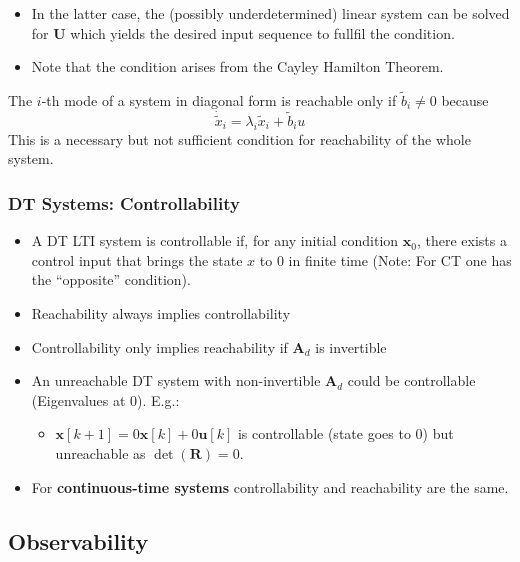 \newpar{}
\begin{itemize}
    \item In the latter case, the (possibly underdetermined) linear system can be solved for $\mathbf{U}$ which yields the desired input sequence to fullfil the condition.
    \item Note that the condition arises from the Cayley Hamilton Theorem.
\end{itemize}


The $i$-th mode of a system in diagonal form is reachable only if $\tilde{b}_i \neq 0$ because
\begin{equation*}
    \dot{\tilde{x}}_i =\lambda_i\tilde{x}_i+\tilde{b}_i u
\end{equation*}
This is a necessary but not sufficient condition for reachability of the whole system.

\subsubsection{DT Systems: Controllability}

\begin{itemize}
    \item A DT LTI system is controllable if, for any initial condition $\mathbf{x}_0$, there exists a control input that brings the state $x$ to $0$ in finite time (Note: For CT one has the ``opposite'' condition).
    \item Reachability always implies controllability
    \item Controllability only implies reachability if $\mathbf{A}_d$ is invertible
    \item An unreachable DT system with non-invertible $\mathbf{A}_d$ could be controllable (Eigenvalues at 0). E.g.:
          \begin{itemize}
              \item $\mathbf{x}[k+1] = 0\mathbf{x}[k] + 0\mathbf{u}[k]$ is controllable (state goes to $0$) but unreachable as $\det(\mathbf{R})=0$.
          \end{itemize}
    \item For \textbf{continuous-time systems} controllability and reachability are the same.
\end{itemize}

\subsection{Observability}

